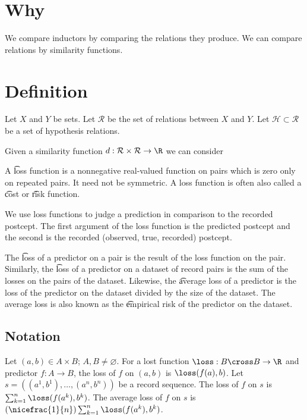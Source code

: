 
\section*{Why}

We compare inductors by comparing the relations they produce.
We can compare relations by similarity functions.

\section*{Definition}

Let $X$ and $Y$ be sets.
Let $\mathcal{R} $ be the set of relations between $X$ and $Y$.
Let $\mathcal{H}  \subset \mathcal{R} $ be a set of hypothesis relations.

Given a similarity function $d: \mathcal{R}  \times  \mathcal{R} \to \R $ we can consider

A \t{loss} function is a nonnegative real-valued function on pairs which is zero only on repeated pairs.
It need not be symmetric.
A loss function is often also called a \t{cost} or \t{risk} function.

We use loss functions to judge a prediction in comparison to the recorded postcept.
The first argument of the loss function is the predicted postcept and the second is the recorded (observed, true, recorded) postcept.

The \t{loss of a predictor on a pair} is the result of the loss function on the pair.
Similarly, the \t{loss of a predictor on a dataset} of record pairs is the sum of the losses on the pairs of the dataset.
Likewise, the \t{average loss} of a predictor is the loss of the predictor on the dataset divided by the size of the dataset.
The average loss is also known as the \t{empirical risk} of the predictor on the dataset.

\subsection*{Notation}

Let $(a, b) \in A \times B$; $A, B \neq \varnothing$.
For a lost function $\loss: B \cross B \to \R $ and predictor $f: A \to B$, the loss of $f$ on $(a, b)$ is $\loss(f(a),b)$.
Let $s = ((a^1, b^1), \dots , (a^n, b^n))$
be a record sequence.
The loss of $f$ on $s$ is $\sum_{k = 1}^{n} \loss(f(a^k), b^k)$.
The average loss of $f$ on $s$ is $(\nicefrac{1}{n})\sum_{k = 1}^{n} \loss(f(a^k), b^k)$.

